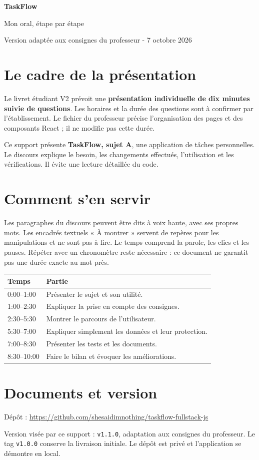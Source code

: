 \documentclass[11pt,a4paper]{article}
\begin{document}
{\Huge\bfseries\textcolor{forest}{TaskFlow}}\par
{\Large Mon oral, étape par étape}\par
\textcolor{muted}{Version adaptée aux consignes du professeur - 7 octobre 2026}
\vspace{0.4cm}

\section*{Le cadre de la présentation}
Le livret étudiant V2 prévoit une \textbf{présentation individuelle de dix minutes suivie de questions}. Les horaires et la durée des questions sont à confirmer par l'établissement. Le fichier du professeur précise l'organisation des pages et des composants React ; il ne modifie pas cette durée.

Ce support présente \textbf{TaskFlow, sujet A}, une application de tâches personnelles. Le discours explique le besoin, les changements effectués, l'utilisation et les vérifications. Il évite une lecture détaillée du code.

\section*{Comment s'en servir}
Les paragraphes du discours peuvent être dits à voix haute, avec ses propres mots. Les encadrés textuels « À montrer » servent de repères pour les manipulations et ne sont pas à lire. Le temps comprend la parole, les clics et les pauses. Répéter avec un chronomètre reste nécessaire : ce document ne garantit pas une durée exacte au mot près.

\begin{tabularx}{\linewidth}{@{}p{2.6cm}X@{}}
\textbf{Temps} & \textbf{Partie}\\\hline
0:00--1:00 & Présenter le sujet et son utilité.\\
1:00--2:30 & Expliquer la prise en compte des consignes.\\
2:30--5:30 & Montrer le parcours de l'utilisateur.\\
5:30--7:00 & Expliquer simplement les données et leur protection.\\
7:00--8:30 & Présenter les tests et les documents.\\
8:30--10:00 & Faire le bilan et évoquer les améliorations.\\
\end{tabularx}

\section*{Documents et version}
Dépôt : \url{https://github.com/shesaidimnothing/taskflow-fullstack-js}\par
Version visée par ce support : \texttt{v1.1.0}, adaptation aux consignes du professeur. Le tag \texttt{v1.0.0} conserve la livraison initiale. Le dépôt est privé et l'application se démontre en local.
\end{document}

